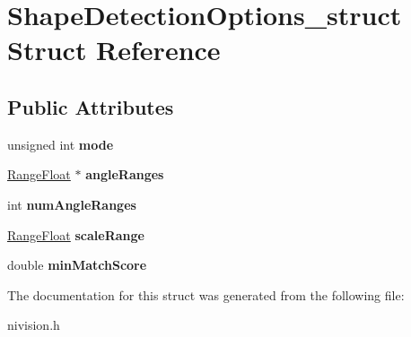 \hypertarget{structShapeDetectionOptions__struct}{
\section{ShapeDetectionOptions\_\-struct Struct Reference}
\label{structShapeDetectionOptions__struct}
}
\subsection*{Public Attributes}
\begin{DoxyCompactItemize}
\item 
\hypertarget{structShapeDetectionOptions__struct_aa32480ba15b493a07fcc6381eff8ff87}{
unsigned int {\bfseries mode}}
\label{structShapeDetectionOptions__struct_aa32480ba15b493a07fcc6381eff8ff87}

\item 
\hypertarget{structShapeDetectionOptions__struct_af637cad25271750dc012e9044e594c71}{
\hyperlink{structRangeFloat__struct}{RangeFloat} $\ast$ {\bfseries angleRanges}}
\label{structShapeDetectionOptions__struct_af637cad25271750dc012e9044e594c71}

\item 
\hypertarget{structShapeDetectionOptions__struct_a0277b59b645822eeaf4764ad06121357}{
int {\bfseries numAngleRanges}}
\label{structShapeDetectionOptions__struct_a0277b59b645822eeaf4764ad06121357}

\item 
\hypertarget{structShapeDetectionOptions__struct_a70f678f8bbdca3cd350efe117cc52b6b}{
\hyperlink{structRangeFloat__struct}{RangeFloat} {\bfseries scaleRange}}
\label{structShapeDetectionOptions__struct_a70f678f8bbdca3cd350efe117cc52b6b}

\item 
\hypertarget{structShapeDetectionOptions__struct_a7b8d94aba889f9fe2a96b6b1ae805b56}{
double {\bfseries minMatchScore}}
\label{structShapeDetectionOptions__struct_a7b8d94aba889f9fe2a96b6b1ae805b56}

\end{DoxyCompactItemize}


The documentation for this struct was generated from the following file:\begin{DoxyCompactItemize}
\item 
nivision.h\end{DoxyCompactItemize}
